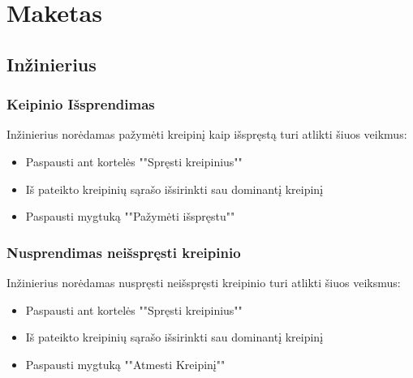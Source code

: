 
\section{Maketas}

\subsection{Inžinierius}
	
	
	

	\subsubsection{Keipinio Išsprendimas}
	
	Inžinierius norėdamas pažymėti kreipinį kaip išspręstą turi atlikti šiuos veikmus:
	\begin{itemize}
		\item Paspausti ant kortelės ""Spręsti kreipinius"" 
		\item Iš pateikto kreipinių sąrašo išsirinkti sau dominantį kreipinį 
		\item Paspausti mygtuką ""Pažymėti išspręstu"" 
	\end{itemize}
	
	\subsubsection{Nusprendimas neišspręsti kreipinio}
	
	Inžinierius norėdamas nuspręsti neišspręsti kreipinio turi atlikti šiuos veiksmus:
	
	\begin{itemize}
		\item Paspausti ant kortelės ""Spręsti kreipinius"" 
		\item Iš pateikto kreipinių sąrašo išsirinkti sau dominantį kreipinį 
		\item Paspausti mygtuką ""Atmesti Kreipinį"" 
	\end{itemize}
	
